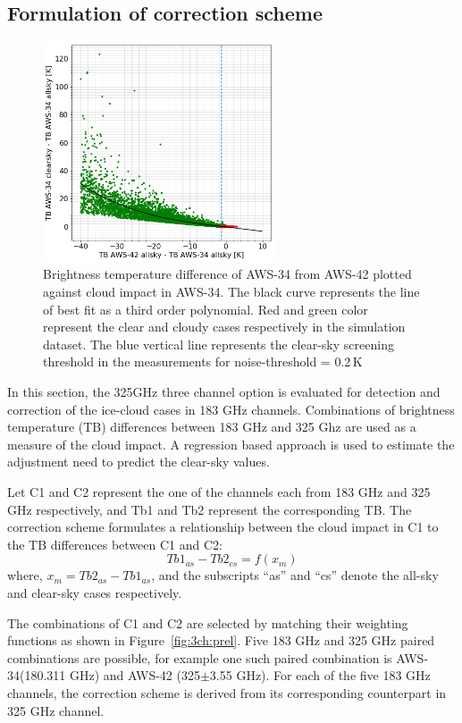 \documentclass[12pt]{article}
\begin{document}
\subsection{Formulation of correction scheme}
%
\begin{figure}[!tb]
	\centering
	\includegraphics[height=65mm]{fit_AWS-34_AWS-42}\hspace{5mm}%
	\caption{Brightness temperature difference of AWS-34 from AWS-42 plotted against cloud impact in AWS-34. The black curve represents the line of best fit as a third order polynomial. Red and green color represent the clear and cloudy cases respectively in the simulation dataset. The blue vertical line represents the clear-sky screening threshold in the measurements for noise-threshold = 0.2\,K   }
	\label{fig:fit:c34-42}
\end{figure}
%
In this section, the 325GHz three channel option is evaluated for detection and correction of the ice-cloud cases in 183 GHz channels. Combinations of brightness temperature (TB) differences between 183 GHz and 325 Ghz are used as a measure of the cloud impact.  A regression based approach is used to estimate the adjustment need to predict the clear-sky values. 

Let C1 and C2 represent the one of the channels each from 183 GHz and 325 GHz respectively, and Tb1 and Tb2 represent the corresponding TB. The correction scheme formulates a relationship between the cloud impact in C1 to the TB differences between C1 and C2:
\begin{equation}
Tb1_{as}-Tb2_{cs} = f(x_m)
\label{eq:TB:diff}
\end{equation}
where, $x_m = Tb2_{as} - Tb1_{as}$, and the subscripts ``as'' and ``cs'' denote the all-sky and clear-sky cases respectively.  

The combinations of C1 and C2 are selected by matching their weighting functions as shown in  Figure~\ref{fig:3ch:prel}. Five  183 GHz and 325 GHz paired combinations are possible, for example one such paired combination is AWS-34(180.311 GHz) and AWS-42 (325$\pm$3.55 GHz). For each of the five 183 GHz channels, the correction scheme is derived from its corresponding counterpart in 325 GHz channel.  
\end{document}
